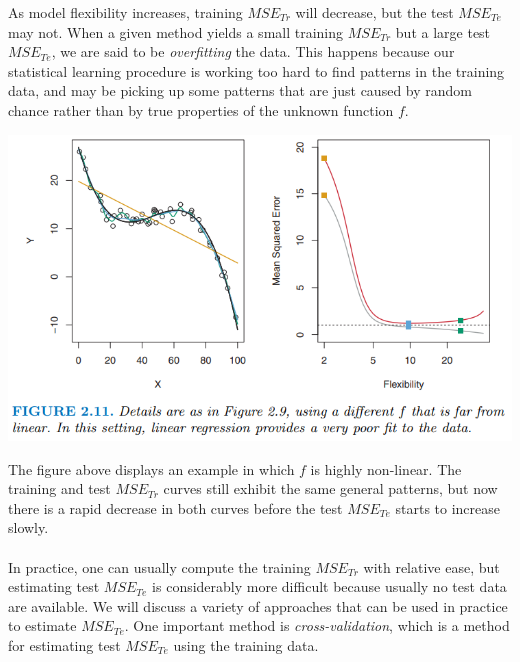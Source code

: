 As model flexibility increases, training $MSE_{Tr}$ will decrease, but the test $MSE_{Te}$ may not. When a given method yields a small training $MSE_{Tr}$ but a large test $MSE_{Te}$, we are said to be \textit{overfitting} the data. This happens because our statistical learning procedure is working too hard to find patterns in the training data, and may be picking up some patterns that are just caused by random chance rather than by true properties of the unknown function $f$.
\begin{center}
    \includegraphics[scale=0.8]{images/overfit_2.png}
\end{center}
The figure above displays an example in which $f$ is highly non-linear. The
training and test $MSE_{Tr}$ curves still exhibit the same general patterns, but now there is a rapid decrease in both curves before the test $MSE_{Te}$ starts to increase slowly.\\\\
In practice, one can usually compute the training $MSE_{Tr}$ with relative
ease, but estimating test $MSE_{Te}$ is considerably more difficult because usually no test data are available. We will discuss a variety of approaches that can be used in practice to estimate $MSE_{Te}$. One important method is \textit{cross-validation}, which is a method for estimating test $MSE_{Te}$ using the training data.

